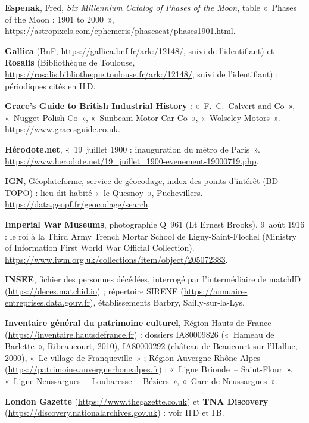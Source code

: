 \begin{biblist}
\item \textbf{Espenak}, Fred, \textit{Six Millennium Catalog of Phases of the Moon}, table «~Phases of the Moon : 1901 to 2000~», \url{https://astropixels.com/ephemeris/phasescat/phases1901.html}.
\item \textbf{Gallica} (BnF, \url{https://gallica.bnf.fr/ark:/12148/}, suivi de l'identifiant) et \textbf{Rosalis} (Bibliothèque de Toulouse, \url{https://rosalis.bibliotheque.toulouse.fr/ark:/12148/}, suivi de l'identifiant) : périodiques cités en II\,D.
\item \textbf{Grace's Guide to British Industrial History} : «~F.~C.~Calvert and Co~», «~Nugget Polish Co~», «~Sunbeam Motor Car Co~», «~Wolseley Motors~». \url{https://www.gracesguide.co.uk}.
\item \textbf{Hérodote.net}, «~19~juillet 1900 : inauguration du métro de Paris~». \url{https://www.herodote.net/19_juillet_1900-evenement-19000719.php}.
\item \textbf{IGN}, Géoplateforme, service de géocodage, index des points d'intérêt (BD TOPO) : lieu-dit habité «~le Quesnoy~», Puchevillers. \url{https://data.geopf.fr/geocodage/search}.
\item \textbf{Imperial War Museums}, photographie Q~961 (Lt Ernest Brooks), 9~août 1916 : le roi à la Third Army Trench Mortar School de Ligny-Saint-Flochel (Ministry of Information First World War Official Collection). \url{https://www.iwm.org.uk/collections/item/object/205072383}.
\item \textbf{INSEE}, fichier des personnes décédées, interrogé par l'intermédiaire de matchID (\url{https://deces.matchid.io}) ; répertoire SIRENE (\url{https://annuaire-entreprises.data.gouv.fr}), établissements Barbry, Sailly-sur-la-Lys.
\item \textbf{Inventaire général du patrimoine culturel}, Région Hauts-de-France (\url{https://inventaire.hautsdefrance.fr}) : dossiers IA80009826 («~Hameau de Barlette~», Ribeaucourt, 2010), IA80000292 (château de Beaucourt-sur-l'Hallue, 2000), «~Le village de Franqueville~» ; Région Auvergne-Rhône-Alpes (\url{https://patrimoine.auvergnerhonealpes.fr}) : «~Ligne Brioude~-- Saint-Flour~», «~Ligne Neussargues~-- Loubaresse~-- Béziers~», «~Gare de Neussargues~».
\item \textbf{London Gazette} (\url{https://www.thegazette.co.uk}) et \textbf{TNA Discovery} (\url{https://discovery.nationalarchives.gov.uk}) : voir II\,D et I\,B.

\end{biblist}

